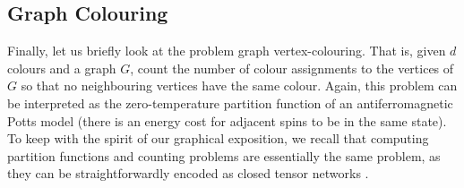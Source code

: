 







\subsection{Graph Colouring}


Finally, let us briefly look at the problem graph vertex-colouring.
That is, given $d$ colours and a graph $G$, count
the number of colour assignments to the vertices of $G$
so that no neighbouring vertices have the same colour.
Again, this problem can be interpreted as the zero-temperature
partition function of an antiferromagnetic Potts model (there is an energy cost for adjacent spins to be in the same state).
To keep with the spirit of our graphical exposition, we recall that computing partition functions and counting problems are essentially the same problem, as they can be straightforwardly encoded as closed tensor networks \cite{10.21468/SciPostPhys.7.5.060,debeaudrap2020tensor}.

